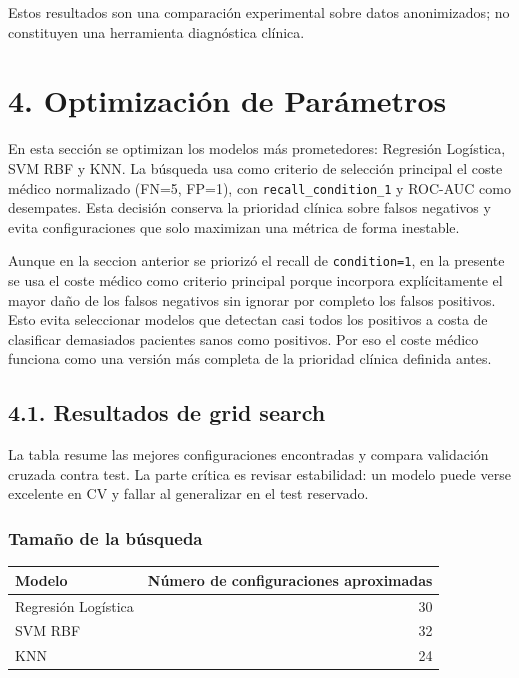 \documentclass[11pt]{article}
\newcounter{none}
\begin{document}
Estos resultados son una comparación experimental sobre datos
anonimizados; no constituyen una herramienta diagnóstica clínica.

    \section{4. Optimización de
Parámetros}\label{optimizaciuxf3n-de-paruxe1metros}

En esta sección se optimizan los modelos más prometedores: Regresión
Logística, SVM RBF y KNN. La búsqueda usa como criterio de selección
principal el coste médico normalizado (FN=5, FP=1), con
\texttt{recall\_condition\_1} y ROC-AUC como desempates. Esta decisión
conserva la prioridad clínica sobre falsos negativos y evita
configuraciones que solo maximizan una métrica de forma inestable.

    Aunque en la seccion anterior se priorizó el recall de
\texttt{condition=1}, en la presente se usa el coste médico como
criterio principal porque incorpora explícitamente el mayor daño de los
falsos negativos sin ignorar por completo los falsos positivos. Esto
evita seleccionar modelos que detectan casi todos los positivos a costa
de clasificar demasiados pacientes sanos como positivos. Por eso el
coste médico funciona como una versión más completa de la prioridad
clínica definida antes.

    \subsection{4.1. Resultados de grid
search}\label{resultados-de-grid-search}

La tabla resume las mejores configuraciones encontradas y compara
validación cruzada contra test. La parte crítica es revisar estabilidad:
un modelo puede verse excelente en CV y fallar al generalizar en el test
reservado.

    \subsubsection{Tamaño de la búsqueda}\label{tamauxf1o-de-la-buxfasqueda}

{\def\LTcaptype{none} %
\begin{longtable}[]{@{}lr@{}}
\toprule\noalign{}
Modelo & Número de configuraciones aproximadas \\
\midrule\noalign{}
\endhead
\bottomrule\noalign{}
\endlastfoot
Regresión Logística & 30 \\
SVM RBF & 32 \\
KNN & 24 \\
\end{longtable}
}
\end{document}
